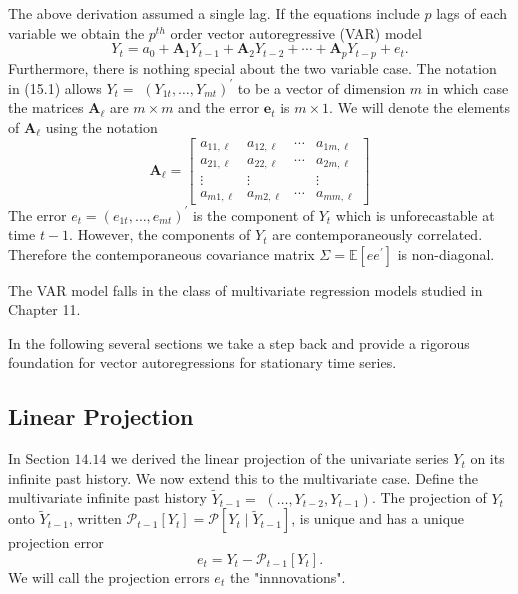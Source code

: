 \documentclass[10pt]{article}
\begin{document}
The above derivation assumed a single lag. If the equations include $p$ lags of each variable we obtain the $p^{t h}$ order vector autoregressive (VAR) model
$$
Y_{t}=a_{0}+\boldsymbol{A}_{1} Y_{t-1}+\boldsymbol{A}_{2} Y_{t-2}+\cdots+\boldsymbol{A}_{p} Y_{t-p}+e_{t} .
$$
Furthermore, there is nothing special about the two variable case. The notation in (15.1) allows $Y_{t}=$ $\left(Y_{1 t}, \ldots, Y_{m t}\right)^{\prime}$ to be a vector of dimension $m$ in which case the matrices $\boldsymbol{A}_{\ell}$ are $m \times m$ and the error $\boldsymbol{e}_{t}$ is $m \times 1$. We will denote the elements of $\boldsymbol{A}_{\ell}$ using the notation
$$
\boldsymbol{A}_{\ell}=\left[\begin{array}{cccc}
a_{11, \ell} & a_{12, \ell} & \cdots & a_{1 m, \ell} \\
a_{21, \ell} & a_{22, \ell} & \cdots & a_{2 m, \ell} \\
\vdots & \vdots & & \vdots \\
a_{m 1, \ell} & a_{m 2, \ell} & \cdots & a_{m m, \ell}
\end{array}\right]
$$
The error $e_{t}=\left(e_{1 t}, \ldots, e_{m t}\right)^{\prime}$ is the component of $Y_{t}$ which is unforecastable at time $t-1$. However, the components of $Y_{t}$ are contemporaneously correlated. Therefore the contemporaneous covariance matrix $\Sigma=\mathbb{E}\left[e e^{\prime}\right]$ is non-diagonal.

The VAR model falls in the class of multivariate regression models studied in Chapter 11.

In the following several sections we take a step back and provide a rigorous foundation for vector autoregressions for stationary time series.

\subsection{Linear Projection}
In Section $14.14$ we derived the linear projection of the univariate series $Y_{t}$ on its infinite past history. We now extend this to the multivariate case. Define the multivariate infinite past history $\widetilde{Y}_{t-1}=$ $\left(\ldots, Y_{t-2}, Y_{t-1}\right)$. The projection of $Y_{t}$ onto $\widetilde{Y}_{t-1}$, written $\mathscr{P}_{t-1}\left[Y_{t}\right]=\mathscr{P}\left[Y_{t} \mid \widetilde{Y}_{t-1}\right]$, is unique and has a unique projection error
$$
e_{t}=Y_{t}-\mathscr{P}_{t-1}\left[Y_{t}\right] .
$$
We will call the projection errors $e_{t}$ the "innnovations".
\end{document}
